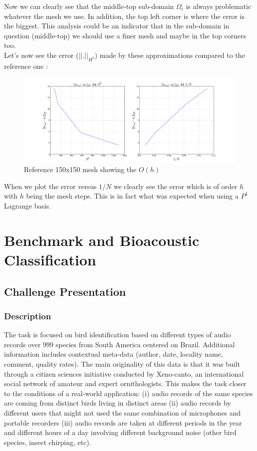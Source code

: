 \documentclass[a4paper]{report}
\begin{document}
Now we can clearly see that the middle-top sub-domain $\Omega_i$ is always problematic whatever the mesh we use. In addition, the top left corner is where the error is the biggest. This analysis could be an indicator that in the sub-domain in question (middle-top) we should use a finer mesh and maybe in the top corners too.
\\
Let's now see the error ($||.||_{H^1}$) made by these approximations compared to the reference one :

\begin{figure}[H]
\begin{center}
\includegraphics[scale=0.25]{error_h.png}\caption{Reference 150x150 mesh showing the $O(h)$}
\end{center}
\end{figure}
When we plot the error versus $1/N$ we clearly see the error which is of order $h$ with $h$ being the mesh steps. This is in fact what was expected when using a $P^1$ Lagrange basis. 
\part{Benchmark and Bioacoustic Classification}

\chapter{Challenge Presentation}

\section{Description}

The task is focused on bird identification based on different types of audio records over 999 species from South America centered on Brazil. Additional information includes contextual meta-data (author, date, locality name, comment, quality rates). The main originality of this data is that it was built through a citizen sciences initiative conducted by Xeno-canto, an international social network of amateur and expert ornithologists. This makes the task closer to the conditions of a real-world application: (i) audio records of the same species are coming from distinct birds living in distinct areas (ii) audio records by different users that might not used the same combination of microphones and portable recorders (iii) audio records are taken at different periods in the year and different hours of a day involving different background noise (other bird species, insect chirping, etc).
\end{document}
